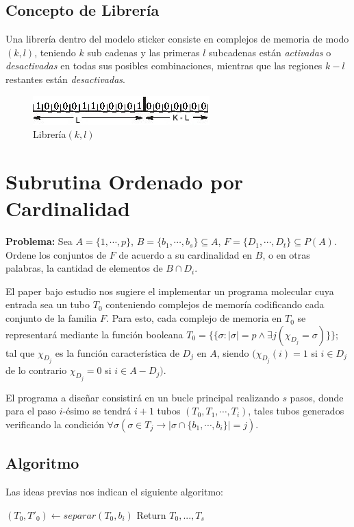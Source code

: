 \documentclass[12pt, letterpaper, twoside]{article}
\begin{document}
    \subsection{Concepto de Librería}
    Una librería dentro del modelo sticker consiste en complejos de memoria de modo $(k,l)$, teniendo $k$ sub cadenas y las primeras $l$ subcadenas están \emph{activadas} o \emph{desactivadas} en todas sus posibles combinaciones, mientras que las regiones $k -l$ restantes están \emph{desactivadas}\autocite{Taghipour2013}.

    \begin{figure}[h!]
        \centering
        \includegraphics[]{libreria.jpg}
        \caption{Librería$(k,l)$}
    \end{figure}

    \section{Subrutina Ordenado por Cardinalidad}
    \textbf{Problema:} Sea $A = \{1,\cdots,p\}$, $B = \{b_1,\cdots,b_s\} \subseteq A$, $F = \{D_1,\cdots,D_t\} \subseteq P(A)$. Ordene los conjuntos de $F$ de acuerdo a su cardinalidad en $B$, o en otras palabras, la cantidad de elementos de $B\cap D_i$.


    El paper bajo estudio nos sugiere el implementar un programa molecular cuya entrada sea un tubo $T_0$ conteniendo complejos de memoría codificando cada conjunto de la familia $F$. Para esto, cada complejo de memoria en $T_0$ se representará mediante la función booleana  $T_0=\{\{\sigma:|\sigma|=p \land \exists j(\chi_{D_j}=\sigma)\}\}$; tal que $\chi_{D_j}$ es la función característica de $D_j$ en $A$, siendo $(\chi_{D_j}(i) = 1$ si $i \in D_j$ de lo contrario $\chi_{D_j} = 0$ si $i \in A - D_j)$.


    El programa a diseñar consistirá en un bucle principal realizando $s$ pasos, donde para el paso $i$-ésimo se tendrá $i+1$ tubos $(T_0, T_1,\cdots,T_i)$, tales tubos generados verificando la condición $\forall\sigma(\sigma\in T_j \rightarrow|\sigma\cap\{b_1,\cdots,b_i\}|=j)$.
    \subsection{Algoritmo}
    Las ideas previas nos indican el siguiente algoritmo: 
    \begin{algorithm}
        \begin{algorithmic}[1]
            \State $(T_0, T'_0) \leftarrow separar(T_0, b_i)$
            \EndFor
            \EndFor
            \State Return $T_0,...,T_s$
            \EndProcedure
        \end{algorithmic}
    \end{algorithm}
\end{document}
